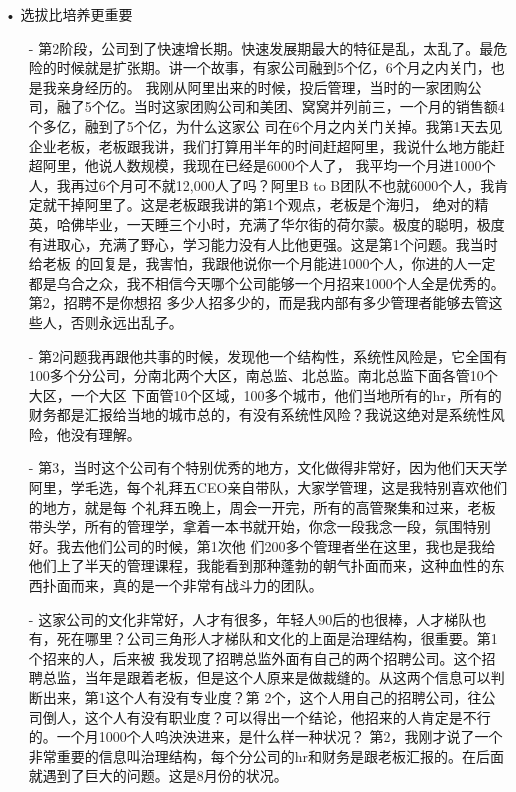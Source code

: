\documentclass[12pt]{article}
\begin{document}
• 选拔比培养更重要
\begin{itemize}
\setlength{\itemsep}{0pt}
\setlength{\parsep}{0pt}
\setlength{\parskip}{0pt}
    \item[-] 第2阶段，公司到了快速增长期。快速发展期最大的特征是乱，太乱了。最危险的时候就是扩张期。讲一个故事，有家公司融到5个亿，6个月之内关门，也是我亲身经历的。 我刚从阿里出来的时候，投后管理，当时的一家团购公司，融了5个亿。当时这家团购公司和美团、窝窝并列前三，一个月的销售额4个多亿，融到了5个亿，为什么这家公 司在6个月之内关门关掉。我第1天去见企业老板，老板跟我讲，我们打算用半年的时间赶超阿里，我说什么地方能赶超阿里，他说人数规模，我现在已经是6000个人了， 我平均一个月进1000个人，我再过6个月可不就12,000人了吗？阿里B to B团队不也就6000个人，我肯定就干掉阿里了。这是老板跟我讲的第1个观点，老板是个海归， 绝对的精英，哈佛毕业，一天睡三个小时，充满了华尔街的荷尔蒙。极度的聪明，极度有进取心，充满了野心，学习能力没有人比他更强。这是第1个问题。我当时给老板 的回复是，我害怕，我跟他说你一个月能进1000个人，你进的人一定都是乌合之众，我不相信今天哪个公司能够一个月招来1000个人全是优秀的。第2，招聘不是你想招 多少人招多少的，而是我内部有多少管理者能够去管这些人，否则永远出乱子。
    \item[-] 第2问题我再跟他共事的时候，发现他一个结构性，系统性风险是，它全国有100多个分公司，分南北两个大区，南总监、北总监。南北总监下面各管10个大区，一个大区 下面管10个区域，100多个城市，他们当地所有的hr，所有的财务都是汇报给当地的城市总的，有没有系统性风险？我说这绝对是系统性风险，他没有理解。
    \item[-] 第3，当时这个公司有个特别优秀的地方，文化做得非常好，因为他们天天学阿里，学毛选，每个礼拜五CEO亲自带队，大家学管理，这是我特别喜欢他们的地方，就是每 个礼拜五晚上，周会一开完，所有的高管聚集和过来，老板带头学，所有的管理学，拿着一本书就开始，你念一段我念一段，氛围特别好。我去他们公司的时候，第1次他 们200多个管理者坐在这里，我也是我给他们上了半天的管理课程，我能看到那种蓬勃的朝气扑面而来，这种血性的东西扑面而来，真的是一个非常有战斗力的团队。
    \item[-] 这家公司的文化非常好，人才有很多，年轻人90后的也很棒，人才梯队也有，死在哪里？公司三角形人才梯队和文化的上面是治理结构，很重要。第1个招来的人，后来被 我发现了招聘总监外面有自己的两个招聘公司。这个招聘总监，当年是跟着老板，但是这个人原来是做裁缝的。从这两个信息可以判断出来，第1这个人有没有专业度？第 2个，这个人用自己的招聘公司，往公司倒人，这个人有没有职业度？可以得出一个结论，他招来的人肯定是不行的。一个月1000个人呜泱泱进来，是什么样一种状况？ 第2，我刚才说了一个非常重要的信息叫治理结构，每个分公司的hr和财务是跟老板汇报的。在后面就遇到了巨大的问题。这是8月份的状况。

\end{itemize}
\end{document}
